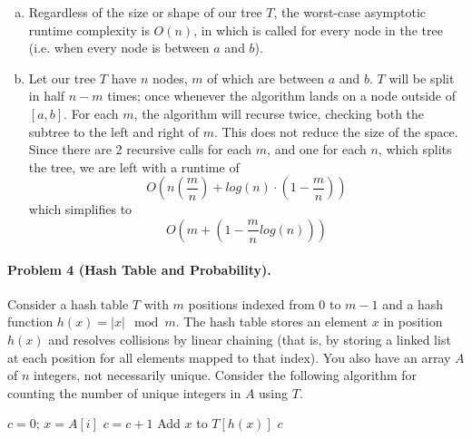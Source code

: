\documentclass[11pt]{article}
\begin{document}
\begin{enumerate}[(a)]
    \item Regardless of the size or shape of our tree $T$, the worst-case
        asymptotic runtime complexity is $O(n)$, in which  is
        called for every node in the tree (i.e. when every node is between
        $a$ and $b$).

    \item Let our tree $T$ have $n$ nodes, $m$ of which are between $a$ and 
        $b$. $T$ will be split in half $n-m$ times; once whenever the algorithm
        lands on a node outside of $[a,b]$. For each $m$, the algorithm will
        recurse twice, checking both the subtree to the left and right of $m$.
        This does not reduce the size of the space. Since there are 2 recursive
        calls for each $m$, and one for each $n$, which splits the tree, we
        are left with a runtime of
        \[
        O\left(n\left(\frac{m}{n}\right) + log(n) \cdot \left(1 -
                \frac{m}{n}\right)\right)
        \]
        which simplifies to
        \[
            \boxed{O\left(m + \left(1 - \frac{m}{n}log(n)\right)\right)}
        \]
        
\end{enumerate}



\newpage
\paragraph{Problem 4 (Hash Table and Probability).}
Consider a hash table $T$ with $m$ positions indexed from $0$ to $m-1$ and a 
hash function $h(x) = |x| \mod m$. The hash table stores an element $x$ in
position $h(x)$ and resolves collisions by linear chaining (that is, by storing 
a linked list at each position for all elements mapped to that index). You also
have an array $A$ of $n$ integers, not necessarily unique. Consider the 
following algorithm for counting the number of unique integers in $A$ using $T$.

\begin{algorithmic}[1]
    \State $c = 0$;
        \State $x = A[i]$
            \State $c = c + 1$
            \State Add $x$ to $T[h(x)]$
        \EndIf
    \EndFor
    \State \Return $c$
\EndProcedure
\end{algorithmic}
\end{document}
